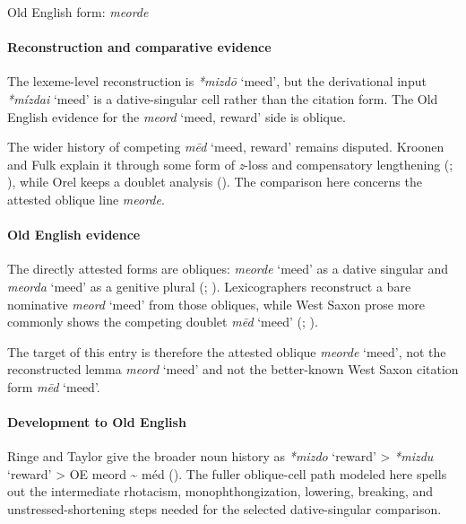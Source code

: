 \documentclass[
  british,
  a4paper,
]{article}
\providecommand{\Recon}[1]{\emph{*#1}}
\begin{document}
Old English form: \emph{meorde}

\paragraph{Reconstruction and comparative
evidence}\label{reconstruction-and-comparative-evidence-127}

The lexeme-level reconstruction is \Recon{mizdō} `meed', but the
derivational input \Recon{mízdai} `meed' is a dative-singular cell
rather than the citation form. The Old English evidence for the
{\emph{meord}} `meed, reward' side is oblique.

The wider history of competing {\emph{mēd}} `meed, reward' remains
disputed. Kroonen and Fulk explain it through some form of \emph{z}-loss
and compensatory lengthening (; ), while Orel keeps a
doublet analysis (). The
comparison here concerns the attested oblique line \emph{meorde}.

\paragraph{Old English evidence}\label{old-english-evidence-127}

The directly attested forms are obliques: {\emph{meorde}} `meed' as a
dative singular and {\emph{meorda}} `meed' as a genitive plural
(;
).
Lexicographers reconstruct a bare nominative {\emph{meord}} `meed' from
those obliques, while West Saxon prose more commonly shows the competing
doublet \emph{mēd} `meed' (; ).

The target of this entry is therefore the attested oblique
{\emph{meorde}} `meed', not the reconstructed lemma {\emph{meord}}
`meed' and not the better-known West Saxon citation form \emph{mēd}
`meed'.

\paragraph{Development to Old
English}\label{development-to-old-english-127}

Ringe and Taylor give the broader noun history as \Recon{mizdo} `reward'
\textgreater{} \Recon{mizdu} `reward' \textgreater{} OE meord
\textasciitilde{} méd (). The fuller oblique-cell path modeled here spells out the
intermediate rhotacism, monophthongization, lowering, breaking, and
unstressed-shortening steps needed for the selected dative-singular
comparison.
\end{document}
